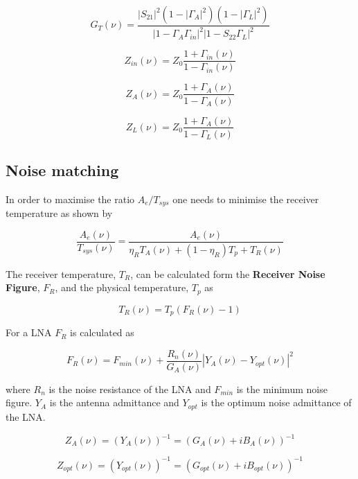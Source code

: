 \documentclass[11pt]{article}
\begin{document}
\begin{equation}
G_{T}(\nu) =\frac{|S_{21}|^2(1-|\Gamma_A|^2)(1-|\Gamma_L|^2)}{|1-\Gamma_A\Gamma_{in}|^2|1-S_{22}\Gamma_{L}|^2}
\end{equation}

\begin{equation}
Z_{in}(\nu) = Z_0\frac{1+\Gamma_{in}(\nu)}{1-\Gamma_{in}(\nu)}
\end{equation}

\begin{equation}
Z_{A}(\nu) = Z_0\frac{1+\Gamma_{A}(\nu)}{1-\Gamma_{A}(\nu)}
\end{equation}

\begin{equation}
Z_{L}(\nu) = Z_0\frac{1+\Gamma_{A}(\nu)}{1-\Gamma_{L}(\nu)}
\end{equation}

\subsection{Noise matching}
In order to maximise the ratio $A_e/T_{sys}$ one needs to minimise the receiver temperature as shown by 

\begin{equation}
\frac{A_{e}(\nu)}{T_{sys}(\nu)} = \frac{A_{e}(\nu)}{\eta_R T_A(\nu) + (1-\eta_R)T_p + T_R(\nu)}
\end{equation}

The receiver temperature, $T_R$, can be calculated form the {\bf Receiver Noise Figure}, $F_R$, and the physical temperature, $T_p$ as

\begin{equation}
T_R(\nu) = T_p(F_R(\nu)-1)
\end{equation}

For a LNA $F_R$ is calculated as

\begin{equation}
F_R(\nu) = F_{min}(\nu)+\frac{R_n(\nu)}{G_A(\nu)}|Y_A(\nu)-Y_{opt}(\nu)|^2
\end{equation}

where $R_n$ is the noise resistance of the LNA and $F_{min}$ is the minimum noise figure. $Y_A$ is the antenna admittance and $Y_{opt}$ is the optimum noise admittance of the LNA. 

\begin{equation}
Z_A(\nu) = (Y_A(\nu))^{-1}= (G_A(\nu)+iB_A(\nu))^{-1}
\end{equation}

\begin{equation}
Z_{opt}(\nu) = (Y_{opt}(\nu))^{-1}= (G_{opt}(\nu)+iB_{opt}(\nu))^{-1}
\end{equation}
\end{document}

